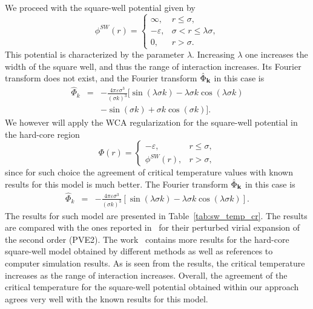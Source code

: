 We proceed with the square-well potential given by
\begin{equation*}
	\label{def:sw}
	\phi^{SW}(r) = \left\{
	\begin{array}{llll}
		\infty, & r\leq \sigma,
		\\
		-\varepsilon, & \sigma < r \leq \lambda\sigma,
		\\
		0, & r > \sigma.
	\end{array}
	\right.
\end{equation*}
This potential is characterized by the parameter $\lambda$. Increasing $\lambda$ one increases the width of the square well, and thus the range of interaction increases.
Its Fourier transform does not exist, and the Fourier transform $\hat{\Phi}_{\vb k}$ in this case is
\begin{eqnarray*}
	\hat{\Phi}_k & = & -\frac{4\pi\varepsilon\sigma^3}{(\sigma k)^3} 
	\bigl[\sin(\lambda \sigma k) - \lambda \sigma k \cos(\lambda \sigma k) 
	\\
	&& - \sin(\sigma k) + \sigma k \cos(\sigma k)\bigl].
\end{eqnarray*}
We however will apply the WCA regularization for the square-well potential
in the hard-core region
\begin{equation*}
	\label{def:sw-wca}
	\Phi(r) = \left\{
	\begin{array}{cc}
		-\varepsilon, & r \leq \sigma, 
		\\
		\phi^{SW}(r), & r > \sigma,
	\end{array}
	\right.
\end{equation*}
since for such choice the agreement of critical temperature values with known results for this model is much better. The Fourier transform $\hat{\Phi}_{\vb k}$ in this case is
\begin{eqnarray*}
	\hat{\Phi}_k & = & -\frac{4\pi\varepsilon\sigma^3}{(\sigma k)^3} 
	\left[\sin(\lambda \sigma k) - \lambda \sigma k \cos(\lambda \sigma k)\right].
\end{eqnarray*}
The results for such model are presented in Table~\ref{tab:sw_temp_cr}. The results are compared with the ones reported in~\cite{KreiciNezbeda2012} for their perturbed virial expansion of the second order (PVE2). The work~\cite{KreiciNezbeda2012} contains more results for the hard-core square-well model obtained by different methods as well as references to computer simulation results.  
As is seen from the results, the critical temperature increases as the range of interaction increases. Overall, the agreement of the critical temperature for the square-well potential obtained within our approach agrees very well with the known results for this model.

